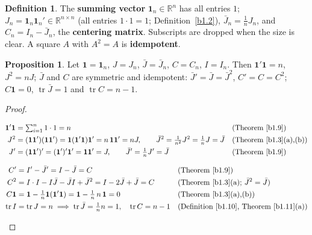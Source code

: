 \documentclass[12pt]{article}
\newcommand{\R}{\mathbb R}
\newcommand{\one}{\mathbf 1}
\DeclareMathOperator{\tr}{tr}
\theoremstyle{definition}
\newtheorem{proposition}[theorem]{Proposition}
\newtheorem{definition}[theorem]{Definition}
\newcommand{\boardtop}{\vspace*{-\abovedisplayskip}}
\begin{document}
\begin{definition}\label{b1.14}
The \textbf{summing vector} \(\one_n\in\R^n\) has all entries \(1\);
\(J_n=\one_n\one_n'\in\R^{n\times n}\) (all entries \(1\cdot1=1\); Definition~\ref{b1.2}), \(\bar J_n=\frac1nJ_n\), and \(C_n=I_n-\bar J_n\), the
\textbf{centering matrix}. Subscripts are dropped when the size is clear. A square \(A\) with \(A^2=A\) is
\textbf{idempotent}.
\end{definition}

\begin{proposition}\label{b1.15}\label{b1.30}
Let \(\one=\one_n\), \(J=J_n\), \(\bar J=\bar J_n\), \(C=C_n\), \(I=I_n\). Then \(\one'\one=n\), \(J^2=nJ\);
\(\bar J\) and \(C\) are symmetric and idempotent: \(\bar J'=\bar J=\bar J^2\), \(C'=C=C^2\); \(C\one=0\), \(\tr\bar J=1\)
and \(\tr C=n-1\).
\end{proposition}
\begin{proof}
\begin{board}[\(\one\), \(J\), \(\bar J\):]
\boardtop
\begin{align*}
\one'\one&=\textstyle\sum_{i=1}^n1\cdot1=n&&\text{(Theorem~\ref{b1.9})}\\
J^2&=(\one\one')(\one\one')=\one(\one'\one)\one'=n\,\one\one'=nJ,\qquad\bar J^2=\tfrac1{n^2}J^2=\tfrac1nJ=\bar J
&&\text{(Theorem~\ref{b1.3}(a),(b))}\\
J'&=(\one\one')'=(\one')'\one'=\one\one'=J,\qquad\bar J'=\tfrac1nJ'=\bar J&&\text{(Theorem~\ref{b1.9})}
\end{align*}
\end{board}
\begin{board}[\(C=I-\bar J\):]
\boardtop
\begin{align*}
C'&=I'-\bar J'=I-\bar J=C&&\text{(Theorem~\ref{b1.9})}\\
C^2&=I\cdot I-I\bar J-\bar JI+\bar J^2=I-2\bar J+\bar J=C&&\text{(Theorem~\ref{b1.3}(a); \(\bar J^2=\bar J\))}\\
C\one&=\one-\tfrac1n\one(\one'\one)=\one-\tfrac1n\,n\,\one=0&&\text{(Theorem~\ref{b1.3}(a),(b))}\\
\tr I&=\tr J=n\implies\tr\bar J=\tfrac1nn=1,\quad\tr C=n-1&&\text{(Definition~\ref{b1.10}, Theorem~\ref{b1.11}(a))}
\end{align*}
\end{board}
\nopagebreak
\end{proof}
\end{document}
